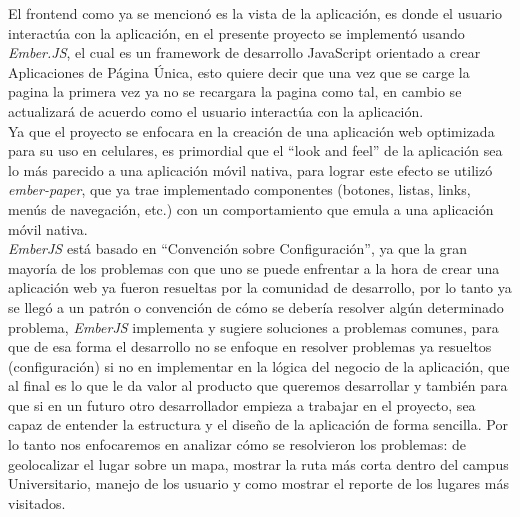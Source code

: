%

El frontend como ya se mencionó es la vista de la aplicación, es donde el usuario interactúa con la aplicación, en el presente proyecto se implementó usando \emph{Ember.JS}, el cual es un framework de desarrollo JavaScript orientado a crear Aplicaciones de Página Única, esto quiere decir que una vez que se carge la pagina la primera vez ya no se recargara la pagina como tal, en cambio se actualizará de acuerdo como el usuario interactúa con la aplicación.\\

Ya que el proyecto se enfocara en la creación de una aplicación web optimizada para su uso en celulares, es primordial que el ``look and feel'' de la aplicación sea lo más parecido a una aplicación móvil nativa, para lograr este efecto se utilizó \emph{ember-paper}, que ya trae implementado componentes (botones, listas, links, menús de navegación, etc.) con un comportamiento que emula a una aplicación móvil nativa.\\


\emph{EmberJS} está basado en ``Convención sobre Configuración'', ya que la gran mayoría de los problemas con que uno se puede enfrentar a la hora de crear una aplicación web ya fueron resueltas por la comunidad de desarrollo, por lo tanto ya se llegó a un patrón o convención de cómo se debería resolver algún determinado problema, \emph{EmberJS} implementa y sugiere soluciones a problemas comunes, para que de esa forma el desarrollo no se enfoque  en resolver problemas ya resueltos (configuración) si no en implementar en la lógica del negocio de la aplicación, que al final es lo que le da valor al producto que queremos desarrollar y también para que si en un futuro otro desarrollador empieza a trabajar en el proyecto, sea capaz de entender la estructura y el diseño de la aplicación de forma sencilla. Por lo tanto nos enfocaremos en analizar cómo se resolvieron los problemas: de geolocalizar el lugar sobre un mapa, mostrar la ruta más corta dentro del campus Universitario, manejo de los usuario y como mostrar el reporte de los lugares más visitados.


